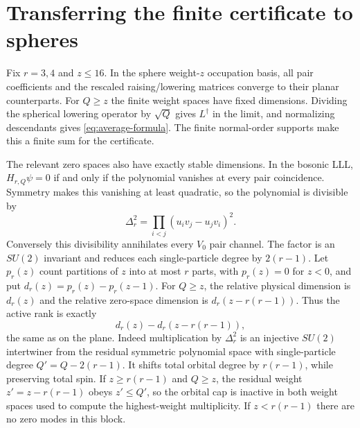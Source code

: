 \documentclass[11pt]{article}
\begin{document}
\section{Transferring the finite certificate to spheres}
Fix $r=3,4$ and $z\le16$. In the sphere weight-$z$ occupation basis, all
pair coefficients and the rescaled raising/lowering matrices converge to
their planar counterparts. For $Q\ge z$ the finite weight spaces have
fixed dimensions. Dividing the spherical lowering operator by $\sqrt Q$
gives $L^\dagger$ in the limit, and normalizing descendants gives
\eqref{eq:average-formula}. The finite normal-order supports make this a
finite sum for the certificate.

The relevant zero spaces also have exactly stable dimensions. In the
bosonic LLL, $H_{r,Q}\psi=0$ if and only if the polynomial vanishes at
every pair coincidence. Symmetry makes this vanishing at least quadratic,
so the polynomial is divisible by
\begin{equation}
 \Delta_r^2=\prod_{i<j}(u_iv_j-u_jv_i)^2.
\end{equation}
Conversely this divisibility annihilates every $V_0$ pair channel.
The factor is an $SU(2)$ invariant and reduces each single-particle degree
by $2(r-1)$. Let $p_r(z)$ count partitions of $z$ into at most $r$ parts,
with $p_r(z)=0$ for $z<0$, and put $d_r(z)=p_r(z)-p_r(z-1)$.
For $Q\ge z$, the relative physical dimension is $d_r(z)$ and the relative
zero-space dimension is $d_r(z-r(r-1))$. Thus the active rank is exactly
\begin{equation}\label{eq:stable-rank}
 d_r(z)-d_r(z-r(r-1)),
\end{equation}
the same as on the plane.
Indeed multiplication by $\Delta_r^2$ is an injective $SU(2)$ intertwiner
from the residual symmetric polynomial space with single-particle degree
$Q'=Q-2(r-1)$. It shifts total orbital degree by $r(r-1)$, while preserving
total spin. If $z\ge r(r-1)$ and $Q\ge z$, the residual weight
$z'=z-r(r-1)$ obeys $z'\le Q'$, so the orbital cap is inactive in both
weight spaces used to compute the highest-weight multiplicity. If
$z<r(r-1)$ there are no zero modes in this block.
\end{document}

